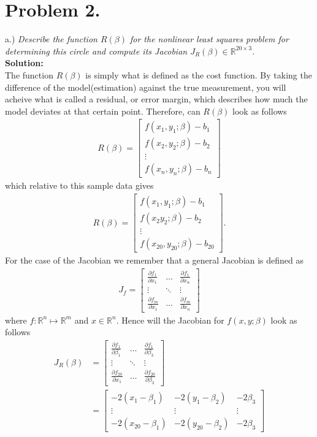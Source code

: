 \documentclass[12pt,
               a4paper,
               article,
               oneside,
               english,oldfontcommands]{memoir}
\newcommand{\R}{\mathbb{R}}
\newcommand{\spaze}{\vspace{4mm}\\}
\begin{document}
\section*{\centering Problem 2.}
a.) \emph{Describe the function $R(\beta)$ for the nonlinear least
squares problem for determining this circle and compute its Jacobian $J_{R}(\beta) \in \R^{20 \times 3}$.} \spaze
\textbf{Solution:}\spaze
The function $R(\beta)$ is simply what is defined as the cost function. By taking the difference of the model(estimation) against the true measurement, you will acheive what is called a residual, or error margin, which describes how much the model deviates at that certain point. Therefore, can $R(\beta)$ look as follows 
\begin{align*}
R(\beta)=  \begin{bmatrix}
f(x_1, y_1; \beta) - b_1 \\[5pt] 
f(x_2, y_2; \beta) - b_2 \\[5pt]
\vdots \\[5pt]
f(x_n, y_n; \beta) - b_n
\end{bmatrix}
\end{align*}
which relative to this sample data gives 
\begin{align*}
R(\beta)=  \begin{bmatrix}
f(x_1, y_1; \beta) - b_1 \\[5pt] 
f(x_2 y_2; \beta) - b_2 \\[5pt]
\vdots \\[5pt]
f(x_{20}, y_{20}; \beta) - b_{20}
\end{bmatrix}.
\end{align*}
For the case of the Jacobian we remember that a general Jacobian is defined as 
\begin{align*}
J_{f} = \begin{bmatrix}
\frac{\partial f_1}{\partial x_1} &\ldots &\frac{\partial f_1}{\partial x_n} \\[5pt]
\vdots &\ddots & \vdots \\[5pt]
\frac{\partial f_m}{\partial x_1} &\ldots &\frac{\partial f_m}{\partial x_n} 
\end{bmatrix}
\end{align*}
where $f: \R^{n} \mapsto \R^{m}$ and $x \in \R^{n}$. Hence will the Jacobian for $f(x,y; \beta)$ look as follows 
\begin{align*}
J_{R}(\beta) &= \begin{bmatrix}
\frac{\partial f_1}{\partial \beta_1} &\ldots &\frac{\partial f_1}{\partial \beta_3} \\[5pt]
\vdots &\ddots & \vdots \\[5pt]
\frac{\partial f_{20}}{\partial x_1} &\ldots &\frac{\partial f_{20}}{\partial \beta_3} 
\end{bmatrix} \\[10pt]
&= \begin{bmatrix}
-2(x_1 - \beta_1) & -2(y_1 - \beta_2)& -2\beta_3\\[5pt]
\vdots & \vdots & \vdots\\[5pt]
 -2(x_{20} - \beta_1) &  -2(y_{20} - \beta_2) & -2\beta_3
\end{bmatrix} \\
\end{align*}
\end{document}
